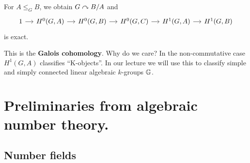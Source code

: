 \begin{outline}
\begin{proposition}
    For $A\leq_G B$, we obtain $G\curvearrowright B/A$ and 
    $$\begin{tikzcd}[column sep=small]
    1 \arrow[r] & H^0(G,A) \arrow[r] & H^0(G,B) \arrow[r] & H^0(G,C) \arrow[r] & H^1(G,A) \arrow[r] & H^1(G,B)
    \end{tikzcd}$$
    is exact.
\end{proposition}

This is the \textbf{Galois cohomology}. Why do we care? In the non-commutative case $H^1(G,A)$ classifies \enquote{K-objects}. In our lecture we will use this to classify simple and simply connected linear algebraic $k$-groups $\mathbb{G}$.

\end{outline}

\section{Preliminaries from algebraic number theory.}

\subsection{Number fields}


